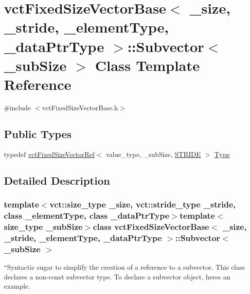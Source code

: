 \hypertarget{classvct_fixed_size_vector_base_1_1_subvector}{}\section{vct\+Fixed\+Size\+Vector\+Base$<$ \+\_\+size, \+\_\+stride, \+\_\+element\+Type, \+\_\+data\+Ptr\+Type $>$\+:\+:Subvector$<$ \+\_\+sub\+Size $>$ Class Template Reference}
\label{classvct_fixed_size_vector_base_1_1_subvector}


{\ttfamily \#include $<$vct\+Fixed\+Size\+Vector\+Base.\+h$>$}

\subsection*{Public Types}
\begin{DoxyCompactItemize}
\item 
typedef \hyperlink{classvct_fixed_size_vector_ref}{vct\+Fixed\+Size\+Vector\+Ref}$<$ value\+\_\+type, \+\_\+sub\+Size, \hyperlink{classvct_fixed_size_vector_base_ace3f97f061ae60acb29f9719787d18a3a953b66e9631c2c4ff134062e7e09a37d}{S\+T\+R\+I\+D\+E} $>$ \hyperlink{classvct_fixed_size_vector_base_1_1_subvector_a069ff7943ff217639b0dbb273d052647}{Type}
\end{DoxyCompactItemize}


\subsection{Detailed Description}
\subsubsection*{template$<$vct\+::size\+\_\+type \+\_\+size, vct\+::stride\+\_\+type \+\_\+stride, class \+\_\+element\+Type, class \+\_\+data\+Ptr\+Type$>$template$<$size\+\_\+type \+\_\+sub\+Size$>$class vct\+Fixed\+Size\+Vector\+Base$<$ \+\_\+size, \+\_\+stride, \+\_\+element\+Type, \+\_\+data\+Ptr\+Type $>$\+::\+Subvector$<$ \+\_\+sub\+Size $>$}

``\+Syntactic sugar\textquotesingle{}\textquotesingle{} to simplify the creation of a reference to a subvector. This class declares a non-\/const subvector type. To declare a subvector object, here\textquotesingle{}s an example.

